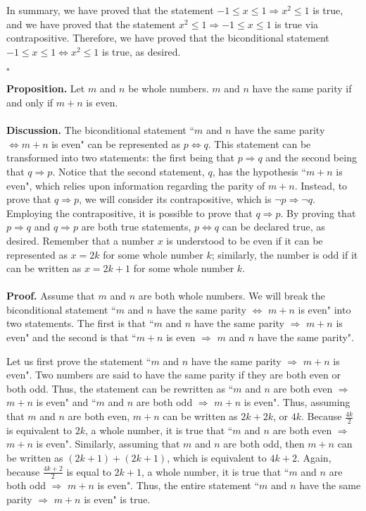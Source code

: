\documentclass[12pt]{exam}
\begin{document}
\begin{questions}
\par
In summary, we have proved that the statement  $-1\leq x\leq1\Rightarrow x^2\leq1$ is true, and we have proved that the statement $x^2\leq1\Rightarrow -1\leq x\leq1$ is true via contrapositive. Therefore, we have proved that the biconditional statement $-1\leq x\leq1 \Leftrightarrow x^2\leq1$ is true, as desired.
\begin{flushright}
$\square$
\end{flushright}

\question
\textbf{Proposition.} Let $m$ and $n$ be whole numbers. $m$ and $n$ have the same parity if and only if $m+n$ is even.
\\
\\\textbf{Discussion.} The biconditional statement ``$m$ and $n$ have the same parity $\Leftrightarrow m+n$ is even" can be represented as $p\Leftrightarrow q$. This statement can be transformed into two statements: the first being that $p\Rightarrow q$ and the second being that $q\Rightarrow p$. Notice that the second statement, $q$, has the hypothesis ``$m+n$ is even", which relies upon information regarding the parity of $m+n$. Instead, to prove that $q\Rightarrow p$, we will consider its contrapositive, which is $\neg p \Rightarrow \neg q$. Employing the contrapositive, it is possible to prove that  $q\Rightarrow p$. By proving that $p\Rightarrow q$ and $q\Rightarrow p$ are both true statements, $p\Leftrightarrow q$ can be declared true, as desired. Remember that a number $x$ is understood to be even if it can be represented as $x=2k$ for some whole number $k$; similarly, the number is odd if it can be written as $x=2k+1$ for some whole number $k$.\\
\\\textbf{Proof.} Assume that $m$ and $n$ are both whole numbers. We will break the biconditional statement ``$m$ and $n$ have the same parity $\Leftrightarrow$  $m+n$ is even" into two statements. The first is that  ``$m$ and $n$ have the same parity $\Rightarrow$ $m+n$ is even" and the second is that ``$m+n$ is even $\Rightarrow$ $m$ and $n$ have the same parity".
\par 
Let us first prove the statement ``$m$ and $n$ have the same parity $\Rightarrow$  $m+n$ is even". Two numbers are said to have the same parity if they are both even or both odd. Thus, the statement can be rewritten as ``$m$ and $n$ are both even $\Rightarrow$  $m+n$ is even" and ``$m$ and $n$ are both odd $\Rightarrow$ $m+n$ is even".  Thus, assuming that $m$ and $n$ are both even, $m+n$ can be written as $2k+2k$, or $4k$. Because $\frac{4k}{2}$ is equivalent to $2k$, a whole number, it is true that ``$m$ and $n$ are both even $\Rightarrow$  $m+n$ is even". Similarly, assuming that $m$ and $n$ are both odd, then $m+n$ can be written as $(2k+1)+(2k+1)$, which is equivalent to $4k+2$. Again, because $\frac{4k+2}{2}$ is equal to $2k+1$, a whole number, it is true that ``$m$ and $n$ are both odd $\Rightarrow$ $m+n$ is even". Thus, the  entire statement ``$m$ and $n$ have the same parity $\Rightarrow$  $m+n$ is even" is true.

\end{questions}
\end{document}
